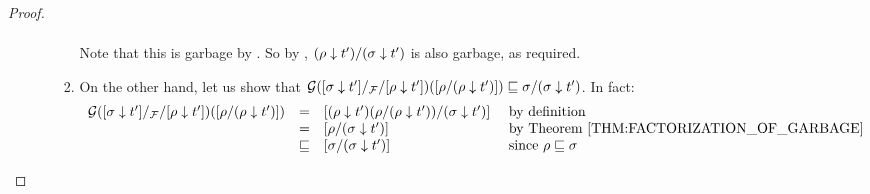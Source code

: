 \begin{proof}
\begin{enumerate}
\begin{enumerate}
\begin{enumerate}
\[\begin{array}{rcll}
            \end{array}
          \]
          Note that this is garbage by .
          So by , $(\rho \downarrow t')/(\sigma \downarrow t')$ is also garbage,
          as required.
    \item On the other hand, let us show that
          $\mathcal{G}({[\sigma \downarrow t']}/_{\mathcal{F}}/{[\rho \downarrow t']})({[\rho/(\rho \downarrow t')]})
          \sqsubseteq
          \sigma/(\sigma \downarrow t')$.
          In fact:
          \[
            \begin{array}{rcll}
              \ulbG(\ptF{\cls{\redseqtwo \sieve \tm'}}{\cls{\redseq \sieve \tm'}})(\cls{\redseq/(\redseq \sieve \tm')})
            & = &
              \cls{ (\redseq \sieve \tm')(\redseq/(\redseq \sieve \tm')) / (\redseqtwo \sieve \tm') } & \text{ by definition} \\
            & = &
              \cls{ \redseq / (\redseqtwo \sieve \tm') } & \text{ by \rthm{factorization_of_garbage}} \\
            & \permle &
              \cls{ \redseqtwo / (\redseqtwo \sieve \tm') } & \text{ since $\redseq \permle \redseqtwo$} \\
            \end{array}
          \]
           

\end{enumerate}
\end{enumerate}
\end{enumerate}
\end{proof}
